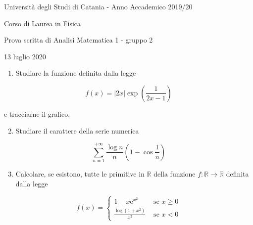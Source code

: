 \documentclass[10pt]{article}
\begin{document}
Università degli Studi di Catania - Anno Accademico 2019/20

Corso di Laurea in Fisica

Prova scritta di Analisi Matematica 1 - gruppo 2

13 luglio 2020

\begin{enumerate}
  \item Studiare la funzione definita dalla legge
\end{enumerate}

\[
f(x)=|2 x| \exp \left(\frac{1}{2 x-1}\right)
\]

e tracciarne il grafico.

\begin{enumerate}
  \setcounter{enumi}{1}
  \item Studiare il carattere della serie numerica
\end{enumerate}

\[
\sum_{n=1}^{+\infty} \frac{\log n}{n}\left(1-\cos \frac{1}{n}\right)
\]

\begin{enumerate}
  \setcounter{enumi}{2}
  \item Calcolare, se esistono, tutte le primitive in \(\mathbb{R}\) della funzione \(f: \mathbb{R} \rightarrow \mathbb{R}\) definita dalla legge
\end{enumerate}

\[
f(x)= \begin{cases}1-x \mathrm{e}^{x^{2}} & \text { se } x \geq 0 \\ \frac{\log \left(1+x^{2}\right)}{x^{2}} & \text { se } x<0\end{cases}
\]
\end{document}
